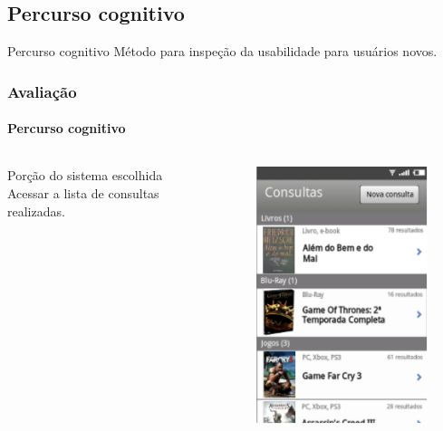 \documentclass[14pt,beamer]{beamer}
\begin{document}
\subsection{Percurso cognitivo}

\begin{frame}
    \begin{block}{Percurso cognitivo}
        Método para inspeção da usabilidade para usuários novos.
    \end{block}
\end{frame}
\begin{frame}
	\frametitle{Avaliação}
	\framesubtitle{Percurso cognitivo}

    \begin{columns}
        \begin{column}{.6\textwidth}
            \begin{block}{Porção do sistema escolhida}
                Acessar a lista de consultas realizadas.
            \end{block}
        \end{column}
        \begin{column}{.4\textwidth}
            \begin{figure}
                \centering
                \includegraphics[scale=.5]{tela/TelaHistorico}
            \end{figure}
        \end{column}
    \end{columns}
\end{frame}
\end{document}
